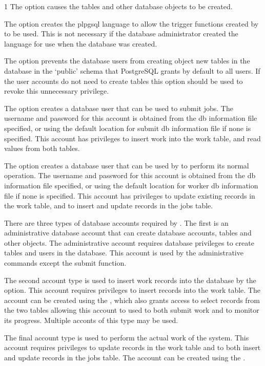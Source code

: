 \begin{ManPage}{\label{man-condor-dbq.pl}}{1}
The  option causes the tables and other database objects to
be created.

The  option creates the plpgsql language to allow the
trigger functions created by  to be used.
This is not necessary if the database administrator created the language for
use when the database was created.

The  option prevents the database users from creating
object new tables in the database in the `public' schema that PostgreSQL grants
by default to all users.
If the user accounts do not need to create tables this option should be used to
revoke this unnecessary privilege.

The  option creates a database user
that can be used to submit jobs.
The username and password for this account is obtained from the db information
file specified, or using the default location for submit db information file
if none is specified.
This account has privileges to  insert work into the work table, and read
values from both tables.

The  option creates a database user
that can be used by  to perform its normal operation.
The username and password for this account is obtained from the db information
file specified, or using the default location for worker db information file
if none is specified.
This account has privileges to update existing records in the work table, and
to insert and update records in the jobs table.

There are three types of database accounts required by .
The first is an administrative database account that can create database
accounts, tables and other objects.
The administrative account requires database privileges to create tables and
users in the database.
This account is used by the administrative commands except the submit function.

The second account type is used to insert work records into the database by the
 option.
This account requires privileges to insert records into the work table.
The account can be created using the , which also
grants access to select records from the two tables allowing this account to
used to both submit work and to monitor its progress.
Multiple acconts of this type may be used.

The final account type is used to perform the actual work of the system.
This account requires privileges to update records in the work table and to
both insert and update records in the jobs table.
The account can be created using the .


\end{ManPage}
